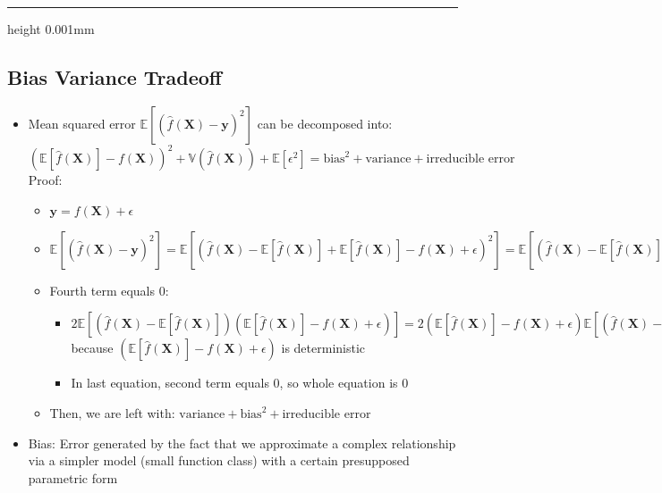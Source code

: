 {\color{black}\hrule height 0.001mm}

\subsection*{Bias Variance Tradeoff}
\begin{itemize}
    \item Mean squared error $\mathbb{E}[ (\hat{f}(\boldsymbol{X}) - \boldsymbol{y})^2 ]$ can be decomposed into: $( \mathbb{E}[\hat{f}(\boldsymbol{X})] - f(\boldsymbol{X}) )^2 + \mathbb{V}(\hat{f}(\boldsymbol{X})) + \mathbb{E}[\epsilon^2] = \textrm{bias}^2 + \textrm{variance} + \textrm{irreducible error}$\\
    Proof:
    \begin{itemize}
        \item $\boldsymbol{y} = f(\boldsymbol{X}) + \epsilon$
        \item $\mathbb{E}[ (\hat{f}(\boldsymbol{X}) - \boldsymbol{y})^2 ] = \mathbb{E}[ (\hat{f}(\boldsymbol{X}) - \mathbb{E}[\hat{f}(\boldsymbol{X})] + \mathbb{E}[\hat{f}(\boldsymbol{X})] - f(\boldsymbol{X}) + \epsilon)^2 ] = \mathbb{E}[ (\hat{f}(\boldsymbol{X}) - \mathbb{E}[\hat{f}(\boldsymbol{X})] )^2 ] + \mathbb{E}[(\mathbb{E}[\hat{f}(\boldsymbol{X})] - f(\boldsymbol{X}))^2] + \mathbb{E}[\epsilon^2] - 2 \mathbb{E}[ (\hat{f}(\boldsymbol{X}) - \mathbb{E} [ \hat{f}(\boldsymbol{X}) ] ) ( \mathbb{E} [ \hat{f}(\boldsymbol{X}) ] - f(\boldsymbol{X}) + \epsilon ) ]$
        \item Fourth term equals 0:
        \begin{itemize}
            \item $2 \mathbb{E}[ (\hat{f}(\boldsymbol{X}) - \mathbb{E} [ \hat{f}(\boldsymbol{X}) ] ) ( \mathbb{E} [ \hat{f}(\boldsymbol{X}) ] - f(\boldsymbol{X}) + \epsilon ) ] = 2( \mathbb{E} [ \hat{f}(\boldsymbol{X}) ] - f(\boldsymbol{X}) + \epsilon ) \mathbb{E}[ (\hat{f}(\boldsymbol{X}) - \mathbb{E} [ \hat{f}(\boldsymbol{X}) ] ) ]$ because $( \mathbb{E} [ \hat{f}(\boldsymbol{X}) ] - f(\boldsymbol{X}) + \epsilon ) $ is deterministic
            \item In last equation, second term equals 0, so whole equation is 0
        \end{itemize}
        \item Then, we are left with: $\textrm{variance} + \textrm{bias}^2 + \textrm{irreducible error}$
    \end{itemize}
    \item Bias: Error generated by the fact that we approximate a complex relationship via a simpler model (small function class) with a certain presupposed parametric form

\end{itemize}
